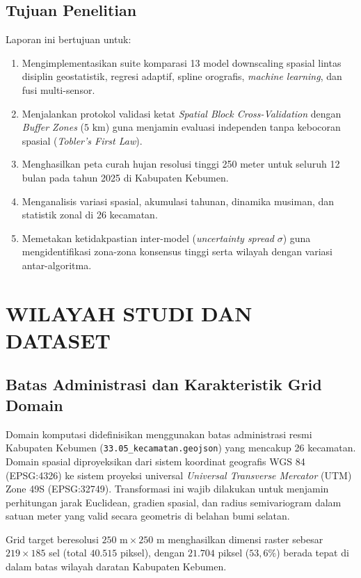 \documentclass[11pt,a4paper]{article}
\begin{document}
\subsection{Tujuan Penelitian}
Laporan ini bertujuan untuk:
\begin{enumerate}
    \item Mengimplementasikan suite komparasi 13 model downscaling spasial lintas disiplin geostatistik, regresi adaptif, spline orografis, \textit{machine learning}, dan fusi multi-sensor.
    \item Menjalankan protokol validasi ketat \textit{Spatial Block Cross-Validation} dengan \textit{Buffer Zones} ($5\text{ km}$) guna menjamin evaluasi independen tanpa kebocoran spasial (\textit{Tobler's First Law}).
    \item Menghasilkan peta curah hujan resolusi tinggi 250 meter untuk seluruh 12 bulan pada tahun 2025 di Kabupaten Kebumen.
    \item Menganalisis variasi spasial, akumulasi tahunan, dinamika musiman, dan statistik zonal di 26 kecamatan.
    \item Memetakan ketidakpastian inter-model (\textit{uncertainty spread} $\sigma$) guna mengidentifikasi zona-zona konsensus tinggi serta wilayah dengan variasi antar-algoritma.
\end{enumerate}

\section{WILAYAH STUDI DAN DATASET}

\subsection{Batas Administrasi dan Karakteristik Grid Domain}
Domain komputasi didefinisikan menggunakan batas administrasi resmi Kabupaten Kebumen (\texttt{33.05\_kecamatan.geojson}) yang mencakup 26 kecamatan. Domain spasial diproyeksikan dari sistem koordinat geografis WGS 84 (EPSG:4326) ke sistem proyeksi universal \textit{Universal Transverse Mercator} (UTM) Zone 49S (EPSG:32749). Transformasi ini wajib dilakukan untuk menjamin perhitungan jarak Euclidean, gradien spasial, dan radius semivariogram dalam satuan meter yang valid secara geometris di belahan bumi selatan.

Grid target beresolusi $250\text{ m} \times 250\text{ m}$ menghasilkan dimensi raster sebesar $219 \times 185$ sel (total $40.515$ piksel), dengan $21.704$ piksel ($53,6\%$) berada tepat di dalam batas wilayah daratan Kabupaten Kebumen.
\end{document}
